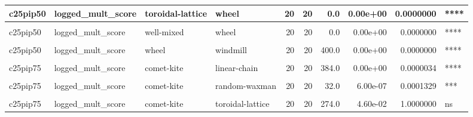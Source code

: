 \documentclass[
]{book}
\begin{document}
\begin{table}
\begin{tabular}{l|l|l|l|r|r|r|r|r|l}
\hline
c25pip50 & logged\_mult\_score & toroidal-lattice & wheel & 20 & 20 & 0.0 & 0.00e+00 & 0.0000000 & ****\\
\hline
\cellcolor{gray!6}{c25pip50} & \cellcolor{gray!6}{logged\_mult\_score} & \cellcolor{gray!6}{toroidal-lattice} & \cellcolor{gray!6}{windmill} & \cellcolor{gray!6}{20} & \cellcolor{gray!6}{20} & \cellcolor{gray!6}{345.0} & \cellcolor{gray!6}{3.36e-05} & \cellcolor{gray!6}{0.0055104} & \cellcolor{gray!6}{**}\\
\hline
c25pip50 & logged\_mult\_score & well-mixed & wheel & 20 & 20 & 0.0 & 0.00e+00 & 0.0000000 & ****\\
\hline
\cellcolor{gray!6}{c25pip50} & \cellcolor{gray!6}{logged\_mult\_score} & \cellcolor{gray!6}{well-mixed} & \cellcolor{gray!6}{windmill} & \cellcolor{gray!6}{20} & \cellcolor{gray!6}{20} & \cellcolor{gray!6}{380.0} & \cellcolor{gray!6}{0.00e+00} & \cellcolor{gray!6}{0.0000097} & \cellcolor{gray!6}{****}\\
\hline
c25pip50 & logged\_mult\_score & wheel & windmill & 20 & 20 & 400.0 & 0.00e+00 & 0.0000000 & ****\\
\hline
\cellcolor{gray!6}{c25pip75} & \cellcolor{gray!6}{logged\_mult\_score} & \cellcolor{gray!6}{comet-kite} & \cellcolor{gray!6}{cycle} & \cellcolor{gray!6}{20} & \cellcolor{gray!6}{20} & \cellcolor{gray!6}{390.0} & \cellcolor{gray!6}{0.00e+00} & \cellcolor{gray!6}{0.0000005} & \cellcolor{gray!6}{****}\\
\hline
c25pip75 & logged\_mult\_score & comet-kite & linear-chain & 20 & 20 & 384.0 & 0.00e+00 & 0.0000034 & ****\\
\hline
\cellcolor{gray!6}{c25pip75} & \cellcolor{gray!6}{logged\_mult\_score} & \cellcolor{gray!6}{comet-kite} & \cellcolor{gray!6}{random-barabasi-albert} & \cellcolor{gray!6}{20} & \cellcolor{gray!6}{20} & \cellcolor{gray!6}{33.0} & \cellcolor{gray!6}{8.00e-07} & \cellcolor{gray!6}{0.0001597} & \cellcolor{gray!6}{***}\\
\hline
c25pip75 & logged\_mult\_score & comet-kite & random-waxman & 20 & 20 & 32.0 & 6.00e-07 & 0.0001329 & ***\\
\hline
\cellcolor{gray!6}{c25pip75} & \cellcolor{gray!6}{logged\_mult\_score} & \cellcolor{gray!6}{comet-kite} & \cellcolor{gray!6}{star} & \cellcolor{gray!6}{20} & \cellcolor{gray!6}{20} & \cellcolor{gray!6}{400.0} & \cellcolor{gray!6}{0.00e+00} & \cellcolor{gray!6}{0.0000000} & \cellcolor{gray!6}{****}\\
\hline
c25pip75 & logged\_mult\_score & comet-kite & toroidal-lattice & 20 & 20 & 274.0 & 4.60e-02 & 1.0000000 & ns\\

\end{tabular}
\end{table}
\end{document}
